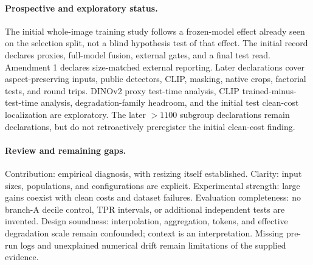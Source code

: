 \documentclass[letterpaper]{article}
\begin{document}
\paragraph{Prospective and exploratory status.} The initial whole-image training study follows a frozen-model effect already seen on the selection split, not a blind hypothesis test of that effect. The initial record declares proxies, full-model fusion, external gates, and a final test read. Amendment 1 declares size-matched external reporting. Later declarations cover aspect-preserving inputs, public detectors, CLIP, masking, native crops, factorial tests, and round trips. DINOv2 proxy test-time analysis, CLIP trained-minus-test-time analysis, degradation-family headroom, and the initial test clean-cost localization are exploratory. The later $>1100$ subgroup declarations remain declarations, but do not retroactively preregister the initial clean-cost finding.

\paragraph{Review and remaining gaps.} Contribution: empirical diagnosis, with resizing itself established. Clarity: input sizes, populations, and configurations are explicit. Experimental strength: large gains coexist with clean costs and dataset failures. Evaluation completeness: no branch-A decile control, TPR intervals, or additional independent tests are invented. Design soundness: interpolation, aggregation, tokens, and effective degradation scale remain confounded; context is an interpretation. Missing pre-run logs and unexplained numerical drift remain limitations of the supplied evidence.


\end{document}
